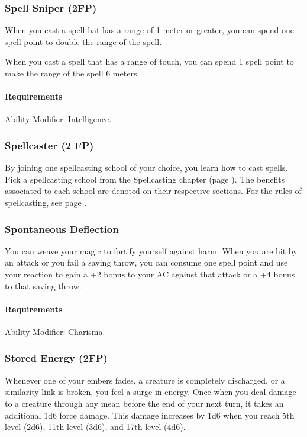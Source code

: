 \subsubsection{Spell Sniper (2FP)} \label{feat::spellsniper}
    When you cast a spell hat has a range of 1 meter or greater, you can spend one spell point to double the range of the spell.

    When you cast a spell that has a range of touch, you can spend 1 spell point to make the range of the spell 6 meters.
    \paragraph{Requirements} Ability Modifier: Intelligence.
\subsubsection{Spellcaster (2 FP)} \label{feat::spellcaster}
    By joining one spellcasting school of your choice, you learn how to cast spells.
    Pick a spellcasting school from the Spellcasting chapter (page \pageref{ch::spellcasting}).
    The benefits associated to each school are denoted on their respective sections.
    For the rules of spellcasting, see page \pageref{sec::spellcastingrules}.
\subsubsection{Spontaneous Deflection} \label{feat::spontaneousdeflection}
    You can weave your magic to fortify yourself against harm.
    When you are hit by an attack or you fail a saving throw, you can consume one spell point and use your reaction to gain a +2 bonus to your AC against that attack or a +4 bonus to that saving throw.
    \paragraph{Requirements} Ability Modifier: Charisma.
\subsubsection{Stored Energy (2FP)} \label{feat::storedenergy}
    Whenever one of your embers fades, a creature is completely discharged, or a similarity link is broken, you feel a surge in energy.
    Once when you deal damage to a creature through any mean before the end of your next turn, it takes an additional 1d6 force damage.
    This damage increases by 1d6 when you reach 5th level (2d6), 11th level (3d6), and 17th level (4d6).
